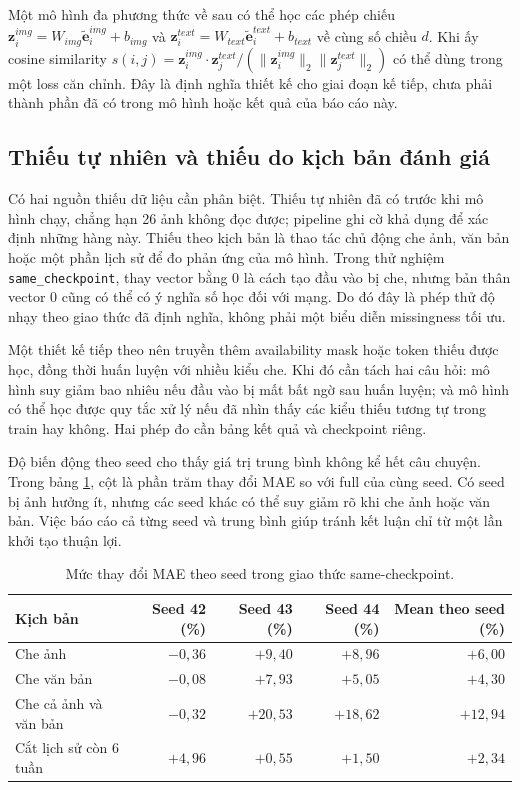 \documentclass[12pt,a4paper,oneside]{article}
\begin{document}
Một mô hình đa phương thức về sau có thể học các phép chiếu $\mathbf{z}^{img}_i=W_{img}\tilde{\mathbf{e}}^{img}_i+b_{img}$ và $\mathbf{z}^{text}_i=W_{text}\tilde{\mathbf{e}}^{text}_i+b_{text}$ về cùng số chiều $d$. Khi ấy cosine similarity $s(i,j)=\mathbf{z}^{img}_i\cdot\mathbf{z}^{text}_j/(\|\mathbf{z}^{img}_i\|_2\|\mathbf{z}^{text}_j\|_2)$ có thể dùng trong một loss căn chỉnh. Đây là định nghĩa thiết kế cho giai đoạn kế tiếp, chưa phải thành phần đã có trong mô hình hoặc kết quả của báo cáo này.

\subsection{Thiếu tự nhiên và thiếu do kịch bản đánh giá}
Có hai nguồn thiếu dữ liệu cần phân biệt. Thiếu tự nhiên đã có trước khi mô hình chạy, chẳng hạn 26 ảnh không đọc được; pipeline ghi cờ khả dụng để xác định những hàng này. Thiếu theo kịch bản là thao tác chủ động che ảnh, văn bản hoặc một phần lịch sử để đo phản ứng của mô hình. Trong thử nghiệm \texttt{same\_checkpoint}, thay vector bằng 0 là cách tạo đầu vào bị che, nhưng bản thân vector 0 cũng có thể có ý nghĩa số học đối với mạng. Do đó đây là phép thử độ nhạy theo giao thức đã định nghĩa, không phải một biểu diễn missingness tối ưu.

Một thiết kế tiếp theo nên truyền thêm availability mask hoặc token thiếu được học, đồng thời huấn luyện với nhiều kiểu che. Khi đó cần tách hai câu hỏi: mô hình suy giảm bao nhiêu nếu đầu vào bị mất bất ngờ sau huấn luyện; và mô hình có thể học được quy tắc xử lý nếu đã nhìn thấy các kiểu thiếu tương tự trong train hay không. Hai phép đo cần bảng kết quả và checkpoint riêng.

Độ biến động theo seed cho thấy giá trị trung bình không kể hết câu chuyện. Trong bảng \ref{tab:missing-seed}, cột là phần trăm thay đổi MAE so với full của cùng seed. Có seed bị ảnh hưởng ít, nhưng các seed khác có thể suy giảm rõ khi che ảnh hoặc văn bản. Việc báo cáo cả từng seed và trung bình giúp tránh kết luận chỉ từ một lần khởi tạo thuận lợi.

\begin{table}[!htbp]
\centering
\small
\caption{Mức thay đổi MAE theo seed trong giao thức same-checkpoint.}
\label{tab:missing-seed}
\begin{tabular}{lrrrr}
\toprule
Kịch bản & Seed 42 (\%) & Seed 43 (\%) & Seed 44 (\%) & Mean theo seed (\%) \\
\midrule
Che ảnh & $-0,36$ & $+9,40$ & $+8,96$ & $+6,00$ \\
Che văn bản & $-0,08$ & $+7,93$ & $+5,05$ & $+4,30$ \\
Che cả ảnh và văn bản & $-0,32$ & $+20,53$ & $+18,62$ & $+12,94$ \\
Cắt lịch sử còn 6 tuần & $+4,96$ & $+0,55$ & $+1,50$ & $+2,34$ \\
\bottomrule
\end{tabular}
\end{table}
\end{document}

